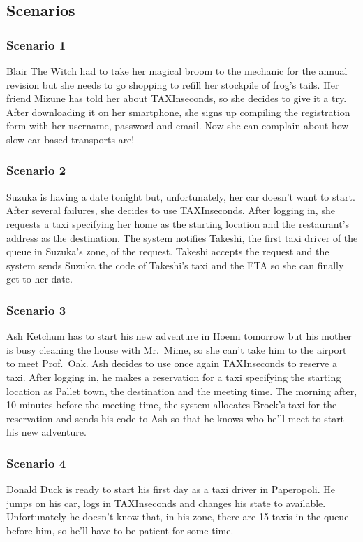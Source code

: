 \documentclass{article}
\begin{document}
\subsection{Scenarios}
\subsubsection{Scenario 1}
Blair The Witch had to take her magical broom to the mechanic for the annual revision but she needs to go shopping to refill her stockpile of frog's tails. Her friend Mizune has told her about TAXInseconds, so she decides to give it a try. After downloading it on her smartphone, she signs up compiling the registration form with her username, password and email. Now she can complain about how slow car-based transports are!
\subsubsection{Scenario 2}
Suzuka is having a date tonight but, unfortunately, her car doesn't want to start. After several failures, she decides to use TAXInseconds\@. After logging in, she requests a taxi specifying her home as the starting location and the restaurant's address as the destination. The system notifies Takeshi, the first taxi driver of the queue in Suzuka's zone, of the request. Takeshi accepts the request and the system sends Suzuka the code of Takeshi's taxi and the ETA so she can finally get to her date.
\subsubsection{Scenario 3}
Ash Ketchum has to start his new adventure in Hoenn tomorrow but his mother is busy cleaning the house with Mr.\ Mime, so she can't take him to the airport to meet Prof.\ Oak. Ash decides to use once again TAXInseconds to reserve a taxi. After logging in, he makes a reservation for a taxi specifying the starting location as Pallet town, the destination and the meeting time. The morning after, 10 minutes before the meeting time, the system allocates Brock's taxi for the reservation and sends his code to Ash so that he knows who he'll meet to start his new adventure. 
\subsubsection{Scenario 4}
Donald Duck is ready to start his first day as a taxi driver in Paperopoli. He jumps on his car, logs in TAXInseconds and changes his state to available. Unfortunately he doesn't know that, in his zone, there are 15 taxis in the queue before him, so he'll have to be patient for some time.
\end{document}
